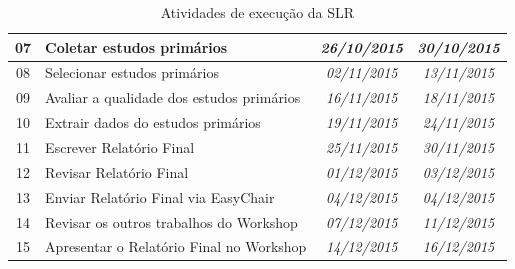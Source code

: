 \documentclass{article}
\begin{document}
\begin{table}[htb]
{\begin{tabular}{|c|l|c|c|}
07          & Coletar estudos primários                                                                                                                 & \textit{26/10/2015}                              & \textit{30/10/2015}                               \\ \hline
08          & Selecionar estudos primários                                                                                                              & \textit{02/11/2015}                              & \textit{13/11/2015}                               \\ \hline
09          & Avaliar a qualidade dos estudos primários                                                                                                 & \textit{16/11/2015}                              & \textit{18/11/2015}                               \\ \hline
10          & Extrair dados do estudos primários                                                                                                        & \textit{19/11/2015}                              & \textit{24/11/2015}                               \\ \hline
11          & Escrever Relatório Final                                                                                                                  & \textit{25/11/2015}                              & \textit{30/11/2015}                               \\ \hline
12          & Revisar Relatório Final                                                                                                                   & \textit{01/12/2015}                              & \textit{03/12/2015}                               \\ \hline
13          & Enviar Relatório Final via EasyChair                                                                                                      & \textit{04/12/2015}                              & \textit{04/12/2015}                               \\ \hline
14          & Revisar os outros trabalhos do Workshop                                                                                                   & \textit{07/12/2015}                              & \textit{11/12/2015}                               \\ \hline
15          & Apresentar o Relatório Final no Workshop                                                                                                  & \textit{14/12/2015}                              & \textit{16/12/2015}                               \\ \hline
\end{tabular}
}
\caption{Atividades de execução da SLR}
\label{tab:cronograma}
\end{table}
\pagebreak
\medskip


\end{document}
